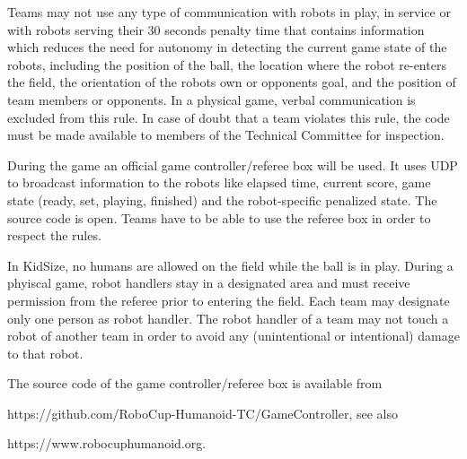 \bigskip


Teams may not use any type of communication
with robots in play, in service or with robots serving their 30 seconds penalty
time that contains information which reduces the need for autonomy in detecting
the current game state of the robots, including the position of the ball,
the location where the robot re-enters the field,
the orientation of the robots own or opponents goal,
and the position of team members or opponents.
In a physical game, verbal communication is excluded from this rule.
In case of doubt that a team violates this rule,
the code must be made available to members of the Technical Committee for inspection.

\bigskip

During the game an official game controller/referee box will be used.
It uses UDP to broadcast information to the robots like elapsed time,
current score, game state (ready, set, playing, finished) and the robot-specific
penalized state. The source code is open.
Teams have to be able to use the referee box in order to respect the rules.



\bigskip

In KidSize, no humans are allowed on the field while the
ball is in play.
During a phyiscal game, robot handlers stay in a designated area and must receive permission from the
referee prior to entering the field.
Each team may designate only one person as robot handler.
The robot handler of a team may not touch a robot of another team in order to
avoid any (unintentional or intentional) damage to that robot.

\bigskip


The source code of the game controller/referee box is available from

\textcolor[rgb]{0.0,0.0,0.49803922}{https://github.com/RoboCup-Humanoid-TC/GameController},
see also 

\textcolor[rgb]{0.0,0.0,0.49803922}{https://www.robocuphumanoid.org}.

